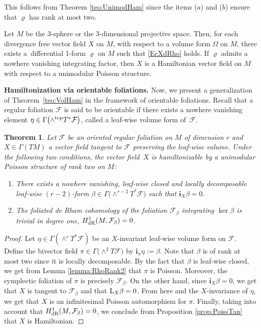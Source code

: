 \documentclass[pdftex]{sigma}%
\newcommand{\ii}{\mathbf{i}}
\numberwithin{equation}{section}
\newtheorem{Theorem}{Theorem}[section]
\begin{document}
This follows from Theorem \ref{teo:UnimodHam} since the items ($a$) and ($b$) ensure that $\varrho$ has rank at most two.

\begin{Example}
Let $M$ be the 3-sphere or the 3-dimensional projective space. Then, for each divergence free vector field $X$ on $M$, with respect to a volume form $\Omega$ on $M$, there exists a~differential 1-form $\varrho$ on $M$ such that \eqref{EcXdRho} holds. If $\varrho$ admits a nowhere vanishing integrating factor, then $X$ is a Hamiltonian vector field on $M$ with respect to a unimodular Poisson structure.
\end{Example}

{\bf Hamiltonization via orientable foliations.} Now, we present a generalization of Theorem~\ref{teo:VolHam} in the framework of orientable foliations. Recall that a regular foliation $\mathcal{F}$ is said to be orientable if there exists a nowhere vanishing element $\eta \in \Gamma\big({\wedge}^{{\rm top}}T^{\ast}\mathcal{F}\big)$, called a leaf-wise volume form of~$\mathcal{F}$.

\begin{Theorem}\label{teo:DoubleFol}
Let $\mathcal{F}$ be an oriented regular foliation on $M$ of dimension $r$ and $X \in \Gamma(TM)$ a vector field tangent to $\mathcal{F}$ preserving the leaf-wise volume. Under the following two conditions, the vector field~$X$ is hamiltonizable by a unimodular Poisson structure of rank two on $M$:
 \begin{enumerate}\itemsep=0pt
 \item[$1.$] There exists a nowhere vanishing, leaf-wise closed and locally decomposable leaf-wise $(r-2)$-form $\beta \in \Gamma\big({\wedge}^{r-2}T^{*}\mathcal{F}\big)$ such that $\ii_{X}\beta = 0$.

 \item[$2.$] The foliated de Rham cohomology of the foliation $\mathcal{F}_{\beta}$ integrating $\ker\beta$ is trivial in degree one, $H^{1}_{{\rm dR}}(M,\mathcal{F}_{\beta}) = 0$.
 \end{enumerate}
\end{Theorem}

\begin{proof}
Let $\eta \in \Gamma(\wedge^{r}T^{*}\mathcal{F})$ be an $X$-invariant leaf-wise volume form on $\mathcal{F}$. Define the bivector field $\pi \in \Gamma\big({\wedge}^{2}T\mathcal{F}\big)$ by $\ii_{\pi}\eta := \beta$. Note that $\beta$ is of rank at most two since it is locally decomposable. By the fact that $\beta$ is leaf-wise closed, we get from Lemma \ref{lemma:RhoRank2} that $\pi$ is Poisson. Moreover, the symplectic foliation of $\pi$ is precisely $\mathcal{F}_{\beta}$. On the other hand, since $\ii_{X}\beta = 0$, we get that $X$ is tangent to $\mathcal{F}_{\beta}$ and that ${\rm L}_{X}\beta = 0$. From here and the $X$-invariance of $\eta$, we get that $X$ is an infinitesimal Poisson automorphism for $\pi$. Finally, taking into account that $H^{1}_{{\rm dR}}(M,\mathcal{F}_{\beta}) = 0$, we conclude from Proposition \ref{prop:PoissTan} that $X$ is Hamiltonian.
\end{proof}
\end{document}
